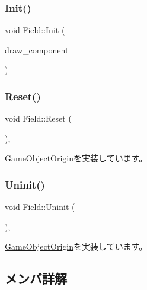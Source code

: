 \subsubsection{\texorpdfstring{Init()}{Init()}}
{\footnotesize\ttfamily void Field\+::\+Init (\begin{DoxyParamCaption}\item[{\mbox{\hyperlink{class_draw_component}{Draw\+Component}} $\ast$}]{draw\+\_\+component }\end{DoxyParamCaption})}

\mbox{\label{class_field_a5b140074dcca821ac702da348238c6d4}} 
\subsubsection{\texorpdfstring{Reset()}{Reset()}}
{\footnotesize\ttfamily void Field\+::\+Reset (\begin{DoxyParamCaption}{ }\end{DoxyParamCaption})\hspace{0.3cm}{\ttfamily [override]}, {\ttfamily [virtual]}}



\mbox{\hyperlink{class_game_object_origin_af9af378a4fd9028316a6fdb461ed6a10}{Game\+Object\+Origin}}を実装しています。

\mbox{\label{class_field_a6d1015e2409daa87cd00485ac1efc06b}} 
\subsubsection{\texorpdfstring{Uninit()}{Uninit()}}
{\footnotesize\ttfamily void Field\+::\+Uninit (\begin{DoxyParamCaption}{ }\end{DoxyParamCaption})\hspace{0.3cm}{\ttfamily [override]}, {\ttfamily [virtual]}}



\mbox{\hyperlink{class_game_object_origin_aeac8fc4a1f625982313a9a60dd35d016}{Game\+Object\+Origin}}を実装しています。



\subsection{メンバ詳解}
\mbox{\label{class_field_a5c4ad4d2fea2269e7ab2185cf09beb10}} 
